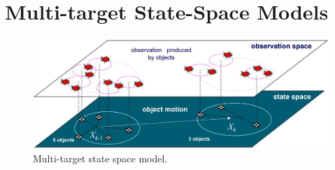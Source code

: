 \documentclass[a4paper,10pt]{scrreprt}
\theoremstyle{theorem}
\theoremstyle{definition}
\begin{document}
\section{Multi-target State-Space Models}

\begin{figure}[h]
	\centering
	\includegraphics[scale=0.25]{./img/multi-target_state_space_model}
	\caption{Multi-target state space model.}
\end{figure}
\end{document}
